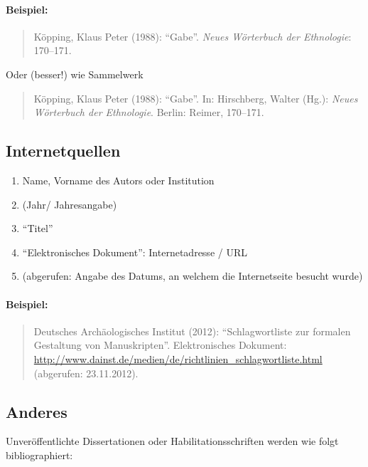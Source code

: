 \documentclass[ 12pt,
                titlepage,
                parskip=half,
                version=first,
                bibliography=totocnumbered,
                final,
                listof=totoc]{scrartcl}
\begin{document}
\paragraph{Beispiel:}
\begin{quote}
Köpping, Klaus Peter (1988): \enquote{Gabe}. \emph{Neues Wörterbuch der Ethnologie}:
170--171.
\end{quote}

Oder (besser!) wie Sammelwerk

\begin{quote}
Köpping, Klaus Peter (1988): \enquote{Gabe}. In: Hirschberg, Walter (Hg.): \emph{Neues
Wörterbuch der Ethnologie}. Berlin: Reimer, 170--171.
\end{quote}

\subsection{Internetquellen}
\label{sec:sub_internetquellen}

\begin{enumerate}
    \item Name, Vorname des Autors oder Institution
    \item (Jahr/ Jahresangabe)
    \item \enquote{Titel}
    \item \enquote{Elektronisches Dokument}: Internetadresse / URL
    \item (abgerufen: Angabe des Datums, an welchem die Internetseite besucht
    wurde)
\end{enumerate}

\paragraph{Beispiel:}
\begin{quote}
Deutsches Archäologisches Institut (2012): \enquote{Schlagwortliste zur formalen
Gestaltung von Manuskripten}. Elektronisches Dokument:
\url{http://www.dainst.de/medien/de/richtlinien_schlagwortliste.html}
(abgerufen: 23.11.2012).
\end{quote}

\subsection{Anderes}
\label{sec:Anderes}

Unveröffentlichte Dissertationen oder Habilitationsschriften werden wie folgt
bibliographiert:
\end{document}
